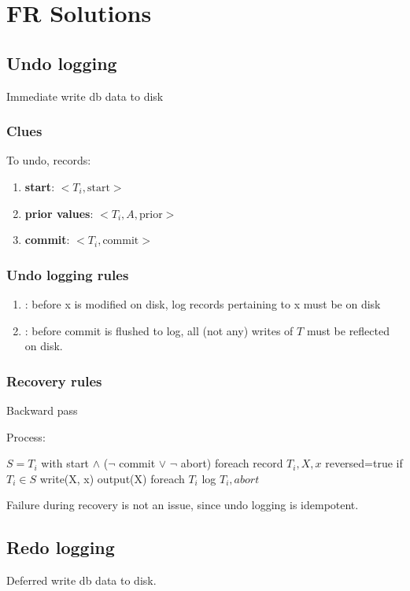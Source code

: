 \documentclass[a4paper]{report}
\begin{document}
\section{FR Solutions}
\subsection{Undo logging}
Immediate write db data to disk 
\subsubsection{Clues}
To undo, records: 
\begin{enumerate}
\item \textbf{start}: $<T_i, \text{start}>$
\item \textbf{prior values}: $<T_i, A, \text{prior}>$
\item \textbf{commit}: $<T_i, \text{commit}>$
\end{enumerate}

\subsubsection{Undo logging rules}
\begin{enumerate}
\item {}: before x is modified on disk, log records pertaining to x must be on disk
\item {}: before commit is flushed to log, all (not any) writes of $T$ must be reflected on disk.
\end{enumerate}

\newpage
\subsubsection{Recovery rules}
Backward pass

Process:
\begin{pseudo}
$S = T_i$ with start $\wedge$ ($\neg$ commit $\vee$ $\neg$ abort)
foreach record $T_i, X, x$ reversed=true
  if $T_i \in S$
    write(X, x) 
    output(X)
foreach $T_i$
  log $T_i, abort$
\end{pseudo}
Failure during recovery is not an issue, since undo logging is idempotent.



\subsection{Redo logging}
Deferred write db data to disk. 
\end{document}
